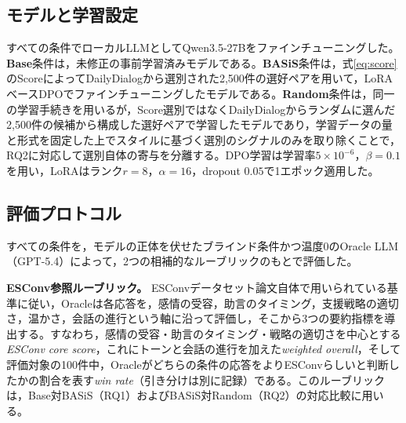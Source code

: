\documentclass[manuscript,review,anonymous]{acmart}
\begin{document}
\subsection{モデルと学習設定}
すべての条件でローカルLLMとしてQwen3.5-27Bをファインチューニングした。\textbf{Base}条件は，未修正の事前学習済みモデルである。\textbf{BASiS}条件は，式\eqref{eq:score}のScoreによってDailyDialogから選別された2{,}500件の選好ペアを用いて，LoRAベースDPOでファインチューニングしたモデルである。\textbf{Random}条件は，同一の学習手続きを用いるが，Score選別ではなくDailyDialogからランダムに選んだ2{,}500件の候補から構成した選好ペアで学習したモデルであり，学習データの量と形式を固定した上でスタイルに基づく選別のシグナルのみを取り除くことで，RQ2に対応して選別自体の寄与を分離する。DPO学習は学習率$5\times10^{-6}$，$\beta=0.1$を用い，LoRAはランク$r=8$，$\alpha=16$，dropout $0.05$で1エポック適用した。

\subsection{評価プロトコル}
\label{sec:evalprotocol}
すべての条件を，モデルの正体を伏せたブラインド条件かつ温度$0$のOracle LLM（GPT-5.4）によって，2つの相補的なルーブリックのもとで評価した。

\textbf{ESConv参照ルーブリック。} ESConvデータセット論文自体で用いられている基準\cite{liu2021esconv}に従い，Oracleは各応答を，感情の受容，助言のタイミング，支援戦略の適切さ，温かさ，会話の進行という軸に沿って評価し，そこから3つの要約指標を導出する。すなわち，感情の受容・助言のタイミング・戦略の適切さを中心とする\emph{ESConv core score}，これにトーンと会話の進行を加えた\emph{weighted overall}，そして評価対象の100件中，Oracleがどちらの条件の応答をよりESConvらしいと判断したかの割合を表す\emph{win rate}（引き分けは別に記録）である。このルーブリックは，Base対BASiS（RQ1）およびBASiS対Random（RQ2）の対応比較に用いる。
\end{document}
